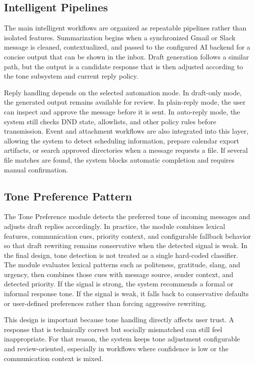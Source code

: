 \subsection{Intelligent Pipelines}
The main intelligent workflows are organized as repeatable pipelines rather than isolated features. Summarization begins when a synchronized Gmail or Slack message is cleaned, contextualized, and passed to the configured AI backend for a concise output that can be shown in the inbox. Draft generation follows a similar path, but the output is a candidate response that is then adjusted according to the tone subsystem and current reply policy.

Reply handling depends on the selected automation mode. In draft-only mode, the generated output remains available for review. In plain-reply mode, the user can inspect and approve the message before it is sent. In auto-reply mode, the system still checks DND state, allowlists, and other policy rules before transmission. Event and attachment workflows are also integrated into this layer, allowing the system to detect scheduling information, prepare calendar export artifacts, or search approved directories when a message requests a file. If several file matches are found, the system blocks automatic completion and requires manual confirmation.

\subsection{Tone Preference Pattern}
The Tone Preference module detects the preferred tone of incoming messages and adjusts draft replies accordingly. In practice, the module combines lexical features, communication cues, priority context, and configurable fallback behavior so that draft rewriting remains conservative when the detected signal is weak.
In the final design, tone detection is not treated as a single hard-coded classifier. The module evaluates lexical patterns such as politeness, gratitude, slang, and urgency, then combines those cues with message source, sender context, and detected priority. If the signal is strong, the system recommends a formal or informal response tone. If the signal is weak, it falls back to conservative defaults or user-defined preferences rather than forcing aggressive rewriting.

This design is important because tone handling directly affects user trust. A response that is technically correct but socially mismatched can still feel inappropriate. For that reason, the system keeps tone adjustment configurable and review-oriented, especially in workflows where confidence is low or the communication context is mixed.


